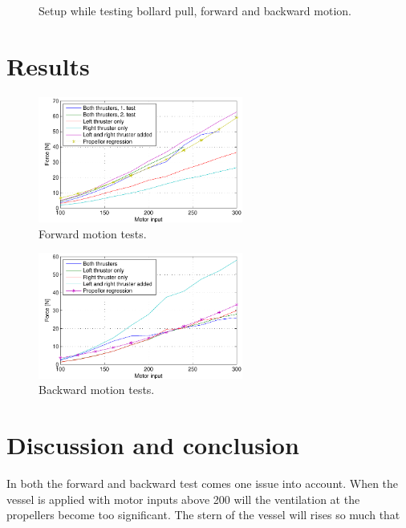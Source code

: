 \begin{figure}[htbp]
	\centering
	
	\caption{Setup while testing bollard pull, forward and backward motion.}
	\label{fig:bollpullsetup}
\end{figure}


\section{Results}
\begin{figure}[htbp]
	\centering
	\includegraphics[width=0.6\textwidth]{plot/forwardthrust}
	\caption{Forward motion tests.}
	\label{fig:bollpullforward}
\end{figure}

\begin{figure}[htbp]
	\centering
	\includegraphics[width=0.6\textwidth]{plot/backthrust}
	\caption{Backward motion tests.}
	\label{fig:bollpullbackward}
\end{figure}

\section{Discussion and conclusion}
In both the forward and backward test comes one issue into account. When the vessel is applied with motor inputs above 200 will the ventilation at the propellers become too significant. The stern of the vessel will rises so much that
